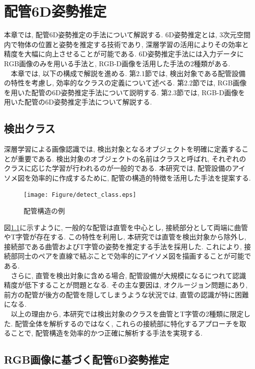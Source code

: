\chapter{配管6D姿勢推定}
本章では, 配管6D姿勢推定の手法について解説する. 
6D姿勢推定とは, 3次元空間内で物体の位置と姿勢を推定する技術であり, 深層学習の活用によりその効率と精度を大幅に向上させることが可能である. 
6D姿勢推定手法には入力データにRGB画像のみを用いる手法と, RGB-D画像を活用した手法の2種類がある. \\
　本章では, 以下の構成で解説を進める. 
第2.1節では, 検出対象である配管設備の特性を考慮し, 効率的なクラスの定義について述べる. 
第2.2節では, RGB画像を用いた配管の6D姿勢推定手法について説明する. 
第2.3節では, RGB-D画像を用いた配管の6D姿勢推定手法について解説する. 

\section{検出クラス}
深層学習による画像認識では, 検出対象となるオブジェクトを明確に定義することが重要である. 
検出対象のオブジェクトの名前はクラスと呼ばれ, それぞれのクラスに応じた学習が行われるのが一般的である. 
本研究では, 配管設備のアイソメ図を効率的に作成するために, 配管の構造的特徴を活用した手法を提案する. 

\begin{figure}[htbt]
	\centering
	 \texttt{[image: Figure/detect\_class.eps]}
	 \caption{配管構造の例}
	 \label{fig:2-f1}
\end{figure}

図\ref{fig:2-f1}に示すように, 一般的な配管は直管を中心とし, 接続部分として両端に曲管やT字管が存在する. 
この特性を利用し, 本研究では直管を検出対象から除外し, 接続部である曲管およびT字管の姿勢を推定する手法を採用した. 
これにより, 接続部同士のペアを直線で結ぶことで効率的にアイソメ図を描画することが可能である. \\
　さらに, 直管を検出対象に含める場合, 配管設備が大規模になるにつれて認識精度が低下することが問題となる. 
その主な要因は, オクルージョン問題にあり, 前方の配管が後方の配管を隠してしまうような状況では, 直管の認識が特に困難になる. \\
　以上の理由から, 本研究では検出対象のクラスを曲管とT字管の2種類に限定した. 
配管全体を解析するのではなく, これらの接続部に特化するアプローチを取ることで, 配管構造を効率的かつ正確に解析する手法を実現する. 

\section{RGB画像に基づく配管6D姿勢推定}
